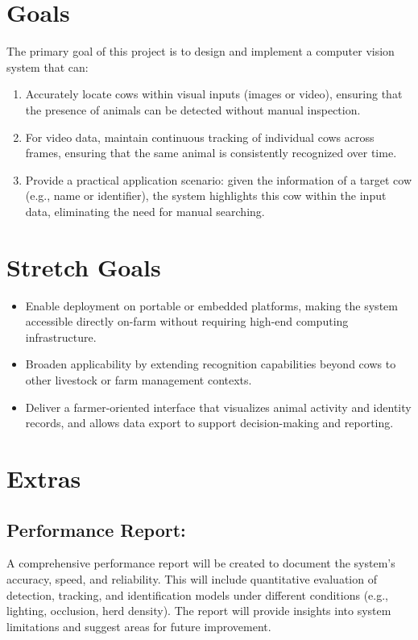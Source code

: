 \documentclass{article}
\begin{document}
\section{Goals}
The primary goal of this project is to design and implement a computer vision system that can:
    \begin{enumerate}
        \item Accurately locate cows within visual inputs (images or video), ensuring that the presence of animals can be detected without manual inspection.
        \item For video data, maintain continuous tracking of individual cows across frames, ensuring that the same animal is consistently recognized over time.
        \item Provide a practical application scenario: given the information of a target cow (e.g., name or identifier), the system highlights this cow within the input data, eliminating the need for manual searching.
    \end{enumerate}

\section{Stretch Goals}
    \begin{itemize}
        \item Enable deployment on portable or embedded platforms, making the system accessible directly on-farm without requiring high-end computing infrastructure.
        \item Broaden applicability by extending recognition capabilities beyond cows to other livestock or farm management contexts.
        \item Deliver a farmer-oriented interface that visualizes animal activity and identity records, and allows data export to support decision-making and reporting.
    \end{itemize}


\section{Extras}
    \subsection{Performance Report:}
        A comprehensive performance report will be created to document the system's 
        accuracy, speed, and reliability. This will include quantitative evaluation of detection, tracking, 
        and identification models under different conditions (e.g., lighting, occlusion, herd density). 
        The report will provide insights into system limitations and suggest areas for future improvement.
\end{document}
